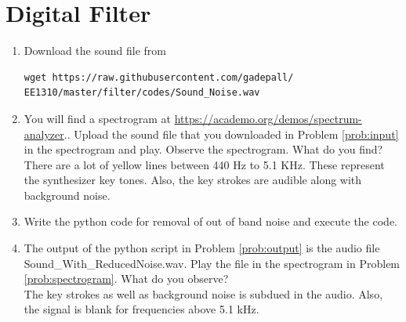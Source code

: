 \documentclass[journal,12pt,twocolumn]{IEEEtran}
\renewcommand\thesection{\arabic{section}}
\begin{document}
\section{Digital Filter}
\begin{enumerate}[label=\thesection.\arabic*
,ref=\thesection.\theenumi]
\item
\label{prob:input}
Download the sound file from  
\begin{lstlisting}
wget https://raw.githubusercontent.com/gadepall/ 
EE1310/master/filter/codes/Sound_Noise.wav
\end{lstlisting}
\item
\label{prob:spectrogram}
You will find a spectrogram at \href{https://academo.org/demos/spectrum-analyzer}{\url{https://academo.org/demos/spectrum-analyzer}}..
%
Upload the sound file that you downloaded in Problem \ref{prob:input} in the spectrogram  and play.  Observe the spectrogram. What do you find?
\\
%
\solution There are a lot of yellow lines between 440 Hz to 5.1 KHz.  These represent the synthesizer key tones. Also, the key strokes
are audible along with background noise.
\item
\label{prob:output}
Write the python code for removal of out of band noise and execute the code.
\\
\solution

%
\item
The output of the python script in Problem \ref{prob:output} is the audio file Sound\_With\_ReducedNoise.wav. Play the file in the spectrogram in Problem \ref{prob:spectrogram}. What do you observe?
\\
\solution The key strokes as well as background noise is subdued in the audio.  Also,  the signal is blank for frequencies above 5.1 kHz.

\end{enumerate}
\end{document}
